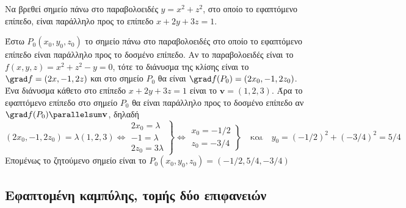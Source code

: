 \begin{example}
  Να βρεθεί σημείο πάνω στο παραβολοειδές $ y=x^{2}+z^{2} $, στο οποίο το εφαπτόμενο 
  επίπεδο, είναι παράλληλο προς το επίπεδο $ x+2y+3z=1 $.
\end{example}
\begin{solution}
  Έστω $ P_{0}(x_{0}, y_{0}, z_{0}) $ το σημείο πάνω στο παραβολοειδές στο οποίο το 
  εφαπτόμενο επίπεδο είναι παράλληλο προς το δοσμένο επίπεδο. Αν το παραβολοειδές 
  είναι το $ f(x,y,z)=x^{2}+z^{2}-y=0 $, τότε το διάνυσμα της κλίσης είναι το
  $ \grad f = (2x,-1,2z) $ και στο σημείο $ P_{0} $ θα είναι $ \grad f(P_{0}) = (2
  x_{0},-1, 2 z_{0}) $. Ένα διάνυσμα κάθετο στο επίπεδο $ x+2y+3z=1 $ είναι το 
  $ \mathbf{v}=(1,2,3) $. Άρα το εφαπτόμενο επίπεδο στο σημείο $ P_{0} $ θα είναι 
  παράλληλο προς το δοσμένο επίπεδο αν $\grad f(P_{0})  \parallelsum \mathbf{v} $, 
  δηλαδή 
  \[
    (2 x_{0}, -1, 2 z_{0}) = \lambda (1,2,3) \Leftrightarrow 
  \left.
      \begin{matrix}
    2 x_{0} = \lambda \\
    -1= \lambda \\ 
    2 z_{0}= 3 \lambda
  \end{matrix} 
\right\} \Leftrightarrow 
\left.
  \begin{matrix}
    x_{0}=-1/2 \\
    z_{0}=-3/4
\end{matrix} 
\right\} \quad \text{και} \quad y_{0}=(-1/2)^{2}+(-3/4)^{2} = 5/4
  \] 
  Επομένως το ζητούμενο σημείο είναι το $ P_{0}(x_{0}, y_{0}, z_{0}) = (-1/2,5/4,-3/4) $

\end{solution}

\subsection*{Εφαπτομένη καμπύλης, τομής δύο επιφανειών}

